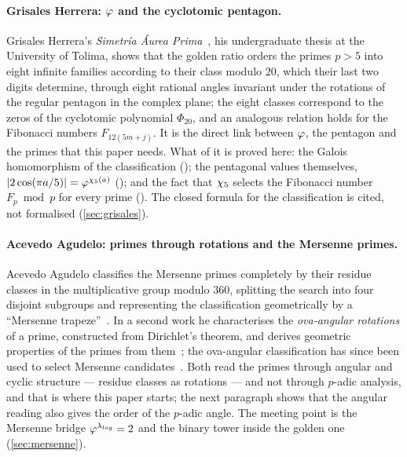 \paragraph{Grisales Herrera: $\varphi$ and the cyclotomic pentagon.}
Grisales Herrera's \emph{Simetría Áurea Prima}~\cite{grisales25}, his undergraduate thesis at the University of
Tolima, shows that the
golden ratio orders the primes $p>5$ into eight infinite families according to their
class modulo $20$, which their last two digits determine, through eight rational angles
invariant under the rotations of the regular pentagon in the complex plane; the eight
classes correspond to the zeros of the cyclotomic polynomial $\Phi_{20}$, and an
analogous relation holds for the Fibonacci numbers $F_{12(5m+j)}$.  It is the direct
link between $\varphi$, the pentagon and the primes that this paper needs.  What
of it is proved here: the Galois homomorphism of the classification
(); the pentagonal values themselves,
$|2\cos(\pi a/5)|=\varphi^{\chi_5(a)}$ (); and the
fact that $\chi_5$ selects the Fibonacci number $F_p\bmod p$ for every prime
().  The closed formula for
the classification is cited, not formalised (\cref{sec:grisales}).

\paragraph{Acevedo Agudelo: primes through rotations and the Mersenne primes.}
Acevedo Agudelo classifies the Mersenne primes completely by their residue
classes in the multiplicative group modulo $360$, splitting the search into four
disjoint subgroups and representing the classification geometrically by a
``Mersenne trapeze''~\cite{acevedo20}.  In a second work he characterises the
\emph{ova-angular rotations} of a prime, constructed from Dirichlet's theorem, and
derives geometric properties of the primes from them~\cite{acevedo21}; the
ova-angular classification has since been used to select Mersenne
candidates~\cite{acevedo23}.  Both read the primes through angular and cyclic
structure --- residue classes as rotations --- and not
through $p$-adic analysis, and that is where this paper
starts; the next paragraph shows that the angular
reading also gives the order of the $p$-adic angle.
The meeting point is the Mersenne bridge
$\varphi^{\lambda_{log}}=2$ and the binary tower inside
the golden one (\cref{sec:mersenne}).

